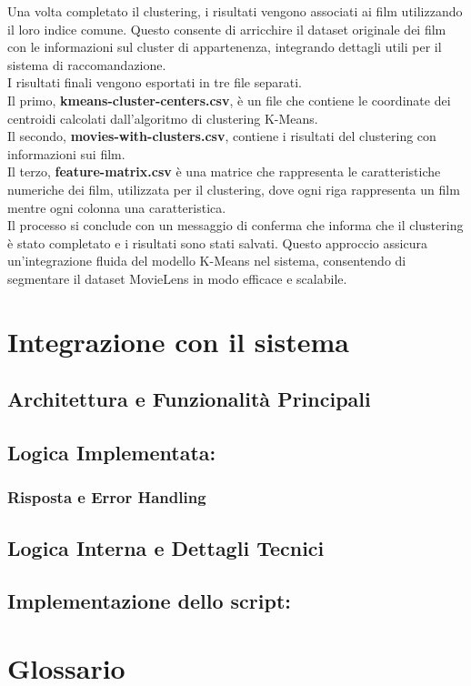 \documentclass[a4paper,12pt]{article}
\begin{document}
Una volta completato il clustering, i risultati vengono associati ai film utilizzando il loro indice comune. Questo consente di arricchire il dataset originale dei film con le informazioni sul cluster di appartenenza, integrando dettagli utili per il sistema di raccomandazione.
\\I risultati finali vengono esportati in tre file separati.\\
Il primo, \textbf{kmeans-cluster-centers.csv}, è un file che contiene le coordinate dei centroidi calcolati dall'algoritmo di clustering K-Means.\\Il secondo, \textbf{movies-with-clusters.csv},  contiene i risultati del clustering con informazioni sui film.\\Il terzo, \textbf{feature-matrix.csv} è una matrice che rappresenta le caratteristiche numeriche dei film, utilizzata per il clustering, dove ogni riga rappresenta un film mentre ogni colonna una caratteristica.\\
Il processo si conclude con un messaggio di conferma che informa che il clustering è stato completato e i risultati sono stati salvati. Questo approccio assicura un'integrazione fluida del modello K-Means nel sistema, consentendo di segmentare il dataset MovieLens in modo efficace e scalabile.
\section{Integrazione con il sistema}
\subsection{Architettura e Funzionalità Principali}
\subsection{Logica Implementata: }
\subsubsection{Risposta e Error Handling}
\subsection{Logica Interna e Dettagli Tecnici}
\subsection{Implementazione dello script: }
\section{Glossario}
\end{document}
